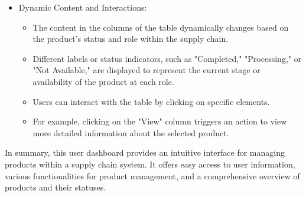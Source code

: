 {\begin{itemize}
\begin{itemize}
      \item The main section of the dashboard features a table presenting an overview of the products.
      \item Each row in the table represents a specific product and contains several columns.
      \item The columns include the product ID and the parties involved in the supply chain, such as farmers, exporters, importers, logistic providers, and retailers.
      \item There are also columns labeled "test," "label," and "view."
   \end{itemize}
   \item Dynamic Content and Interactions:
   \begin{itemize}

\item The content in the columns of the table dynamically changes based on the product's status and role within the supply chain.
\item Different labels or status indicators, such as "Completed," "Processing," or "Not Available," are displayed to represent the current stage or availability of the product at each role.
\item Users can interact with the table by clicking on specific elements.
\item For example, clicking on the "View" column triggers an action to view more detailed information about the selected product.
\end{itemize}
\end{itemize}
In summary, this user dashboard provides an intuitive interface for managing products within a supply chain system. It offers easy access to user information, various functionalities for product management, and a comprehensive overview of products and their statuses.\par }